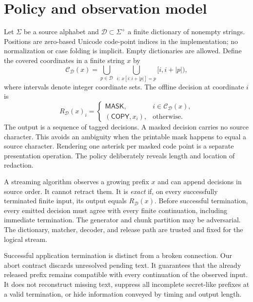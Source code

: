 \documentclass[11pt,a4paper]{article}
\newcommand{\D}{\mathcal{D}}
\newcommand{\C}{\mathcal{C}}
\newcommand{\mask}{\mathsf{MASK}}
\newcommand{\copyc}{\mathsf{COPY}}
\begin{document}
\section{Policy and observation model}
Let $\Sigma$ be a source alphabet and $\D\subset\Sigma^+$ a finite dictionary of nonempty strings. Positions are zero-based Unicode code-point indices in the implementation; no normalization or case folding is implicit. Empty dictionaries are allowed. Define the covered coordinates in a finite string $x$ by
\begin{equation}
\C_\D(x)=\bigcup_{p\in\D}\ \bigcup_{i:\ x[i:i+|p|]=p}[i,i+|p|),
\end{equation}
where intervals denote integer coordinate sets. The offline decision at coordinate $i$ is
\begin{equation}
R_\D(x)_i=\begin{cases}\mask,&i\in\C_\D(x),\\(\copyc,x_i),&\text{otherwise.}\end{cases}
\end{equation}
The output is a sequence of tagged decisions. A masked decision carries no source character. This avoids an ambiguity when the printable mask happens to equal a source character. Rendering one asterisk per masked code point is a separate presentation operation. The policy deliberately reveals length and location of redaction.

A streaming algorithm observes a growing prefix $x$ and can append decisions in source order. It cannot retract them. It is \emph{exact} if, on every successfully terminated finite input, its output equals $R_\D(x)$. Before successful termination, every emitted decision must agree with every finite continuation, including immediate termination. The generator and chunk partition may be adversarial. The dictionary, matcher, decoder, and release path are trusted and fixed for the logical stream.

Successful application termination is distinct from a broken connection. Our abort contract discards unresolved pending text. It guarantees that the already released prefix remains compatible with every continuation of the observed input. It does not reconstruct missing text, suppress all incomplete secret-like prefixes at a valid termination, or hide information conveyed by timing and output length.
\end{document}
